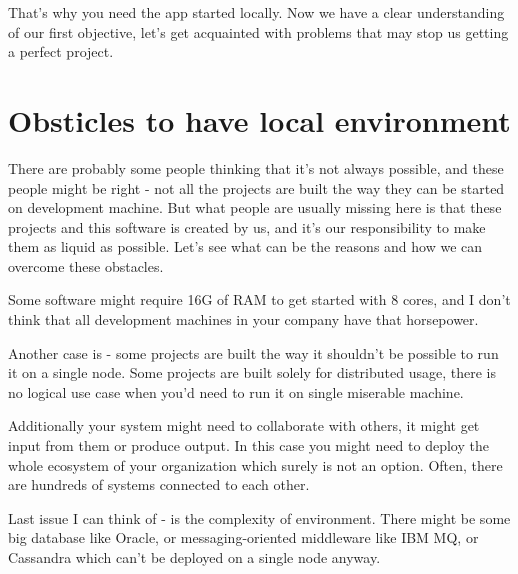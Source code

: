 \documentclass[11pt,a4paper,oneside]{article}
\begin{document}
That's why you need the app started locally. Now we have a clear understanding of our first objective, let's get acquainted with problems that may stop us getting a perfect project.

\section{Obsticles to have local environment}

There are probably some people thinking that it's not always possible, and these people might be right - not all the projects are built the way they can be started on development machine. But what people are usually missing here is that these projects and this software is created by us, and it's our responsibility to make them as liquid as possible. Let's see what can be the reasons and how we can overcome these obstacles.

Some software might require 16G of RAM to get started with 8 cores, and I don't think that all development machines in your company have that horsepower. 

Another case is - some projects are built the way it shouldn't be possible to run it on a single node. Some projects are built solely for distributed usage, there is no logical use case when you'd need to run it on single miserable machine.

Additionally your system might need to collaborate with others, it might get input from them or produce output. In this case you might need to deploy the whole ecosystem of your organization which surely is not an option. Often, there are hundreds of systems connected to each other.

Last issue I can think of - is the complexity of environment. There might be some big database like Oracle, or messaging-oriented middleware like IBM MQ, or Cassandra which can't be deployed on a single node anyway. 
\end{document}
